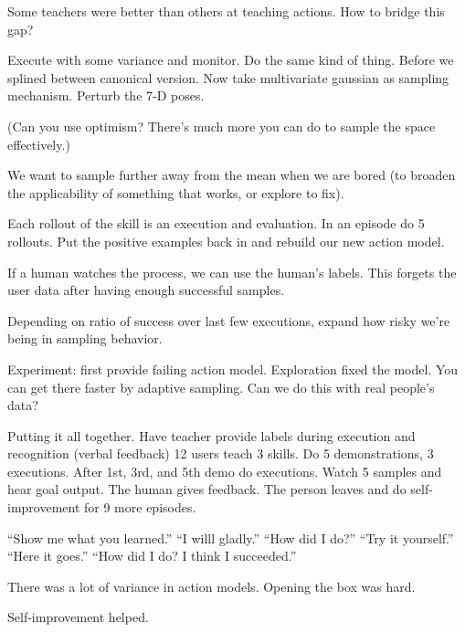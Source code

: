 Some teachers were better than others at teaching actions. How to bridge this gap?


Execute with some variance and monitor. Do the same kind of thing. Before we splined between canonical version. Now take multivariate gaussian as sampling mechanism. %
Perturb the 7-D poses.

(Can you use optimism? There's much more you can do to sample the space effectively.)

We want to sample further away from the mean when we are bored (to broaden the applicability of something that works, or explore to fix).

Each rollout of the skill is an execution and evaluation.
In an episode do 5 rollouts. Put the positive examples back in and rebuild our new action model.

If a human watches the process, we can use the human's labels. This forgets the user data after having enough successful samples.


Depending on ratio of success over last few executions, expand how risky we're being in sampling behavior.

Experiment: first provide failing action model. Exploration fixed the model. You can get there faster by adaptive sampling.
Can we do this with real people's data?

Putting it all together. Have teacher provide labels during execution and recognition (verbal feedback)
12 users teach 3 skills. Do 5 demonstrations, 3 executions. After 1st, 3rd, and 5th demo do executions. Watch 5 samples and hear goal output. The human gives feedback. The person leaves and do self-improvement for 9 more episodes.

``Show me what you learned.'' ``I willl gladly.'' ``How did I do?'' ``Try it yourself.'' ``Here it goes.'' ``How did I do? I think I succeeded.''

There was a lot of variance in action models. Opening the box was hard.

Self-improvement helped.

